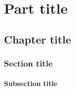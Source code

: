 \documentclass[english,counters by chapter]{uniud}
\begin{document}

\frontmatter

\maketitle

\begin{acknowledgements}

\blindtext

\end{acknowledgements}

\begin{abstract}

\blindtext

\end{abstract}

\cleardoublepage

\tableofcontents*


\mainmatter


\part{Part title}

\chapter{Chapter title}
\blindmathtrue

\blindtext

\section{Section title}

\blindtext

\subsection{Subsection title}

\blindtext
\end{document}

